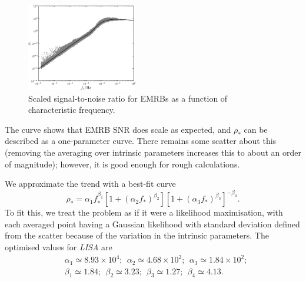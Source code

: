 \documentclass[useAMS,usedcolumn,usegraphicx,usenatbib]{mn2e}
\begin{document}
\begin{figure}
\begin{center}
 \includegraphics[width=0.43\textwidth]{Fig_SNR_scaled_fit}
 \caption{Scaled signal-to-noise ratio for EMRBs as a function of characteristic frequency.\label{fig:scaled-SNR}}
   \end{center}
\end{figure}
The curve shows that EMRB SNR does scale as expected, and $\rho_\ast$ can be described as a one-parameter curve. There remains some scatter about this (removing the averaging over intrinsic parameters increases this to about an order of magnitude); however, it is good enough for rough calculations.

We approximate the trend with a best-fit curve
\begin{equation}
\rho_\ast = \alpha_1 f_\ast^{\beta_1} \left[1 + \left(\alpha_2 f_\ast\right)^{\beta_2}\right]\left[1 + \left(\alpha_3 f_\ast\right)^{\beta_3}\right]^{-\beta_4}.
\label{eq:scaled-SNR}
\end{equation}
To fit this, we treat the problem as if it were a likelihood maximisation, with each averaged point having a Gaussian likelihood with standard deviation defined from the scatter because of the variation in the intrinsic parameters. The optimised values for \textit{LISA} are
\begin{equation}
\begin{split}
&\alpha_1 \simeq 8.93 \times 10^4; \ \ \alpha_2 \simeq 4.68 \times 10^2; \ \  \alpha_3 \simeq 1.84 \times 10^2;\\
&\beta_1 \simeq 1.84; \ \ \beta_2 \simeq 3.23; \ \ \beta_3 \simeq 1.27; \ \ \beta_4 \simeq 4.13.
\end{split}
\end{equation}
\end{document}
